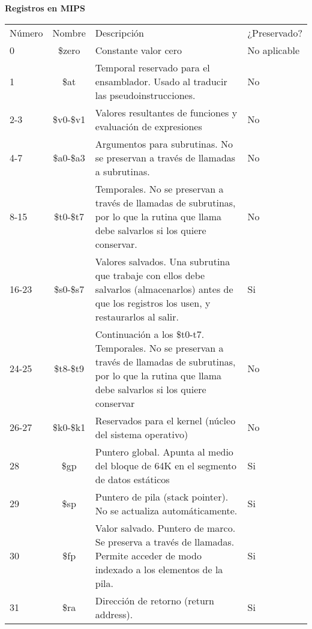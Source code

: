 \documentclass{article}
\begin{document}
\quad
\newline
\newline

\textbf{Registros en  MIPS}


\begin{tabular}{| p{1cm} | c | p{4cm} | p{2cm} |}
    \hline
    \rowcolor{Gray}
    \multicolumn{4}{ |c| }{Registros} \\ 
    \hline
    \rowcolor{LightCyan}
    Número & Nombre & Descripción & ¿Preservado? \\ 
    \hline
    0 & \$zero & Constante valor cero & No aplicable \\
    \hline
    1 & \$at & Temporal reservado para el ensamblador. Usado al traducir las
pseudoinstrucciones. & No \\
    \hline
    2-3 & \$v0-\$v1 & Valores resultantes de funciones y evaluación de expresiones & No \\
    \hline
    4-7 & \$a0-\$a3 & Argumentos para subrutinas. No se preservan a través de llamadas a subrutinas. & No \\
    \hline
    8-15 & \$t0-\$t7 & Temporales. No se preservan a través de llamadas de subrutinas, por lo que la rutina que llama debe salvarlos si los quiere conservar. & No \\
    \hline
    16-23 & \$s0-\$s7 & Valores salvados. Una subrutina que trabaje con ellos debe salvarlos (almacenarlos) antes de que los registros los usen, y restaurarlos al salir. & Si \\
    \hline
    24-25 & \$t8-\$t9 & Continuación a los \$t0-t7. Temporales. No se preservan a través de llamadas de subrutinas, por lo que la rutina que llama debe salvarlos si los quiere conservar & No \\
    \hline
    26-27 & \$k0-\$k1 & Reservados para el kernel (núcleo del sistema operativo) & No \\
    \hline
    28 & \$gp & Puntero global. Apunta al medio del bloque de 64K en el segmento de datos estáticos & Si \\
    \hline
    29 & \$sp & Puntero de pila (stack pointer). No se actualiza automáticamente. & Si \\
    \hline
    30 & \$fp & Valor salvado. Puntero de marco. Se preserva a través de llamadas. Permite acceder de modo indexado a los elementos de la pila. & Si \\
    \hline
    31 & \$ra & Dirección de retorno (return address). & Si \\
    \hline
\end{tabular}
\end{document}
